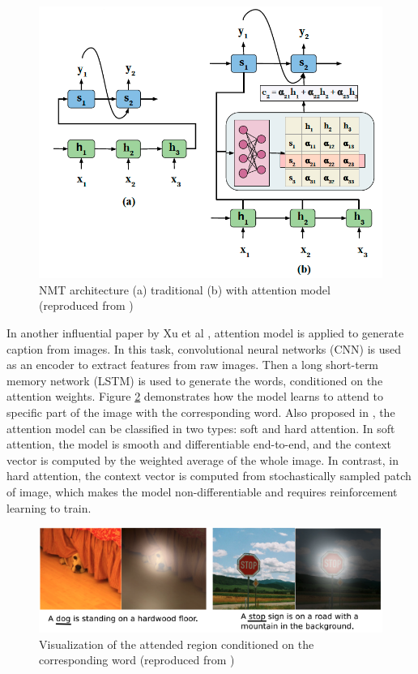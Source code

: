 \documentclass[journal]{IEEEtran}
\begin{document}
\begin{figure}[htb]
  \centering
  \includegraphics[width=0.7\columnwidth]{NMT.png}
  \caption{NMT architecture (a) traditional (b) with attention model
  (reproduced from \cite{chaudhari1904attentive})}
  \label{NMT}
\end{figure}

In another influential paper by Xu et al \cite{xu2015show}, attention model is applied to generate caption from images. 
In this task, convolutional neural networks (CNN) is used as an encoder to extract features from raw images.
Then a long short-term memory network (LSTM) is used to generate the words, conditioned on the attention weights.
Figure \ref{attention} demonstrates how the model learns to attend to specific part of the image with the corresponding word. 
Also proposed in \cite{xu2015show}, the attention model can be classified in two types: soft and hard attention. 
In soft attention, the model is smooth and differentiable end-to-end, and the context vector is computed by the weighted average of the whole image. 
In contrast, in hard attention, the context vector is computed from stochastically sampled patch of image, 
which makes the model non-differentiable and requires reinforcement learning to train.

\begin{figure}[htb]
  \includegraphics[width=\linewidth]{attention.png}
  \caption{Visualization of the attended region conditioned on the corresponding word
  (reproduced from \cite{xu2015show})}
  \label{attention}
\end{figure}
\end{document}
